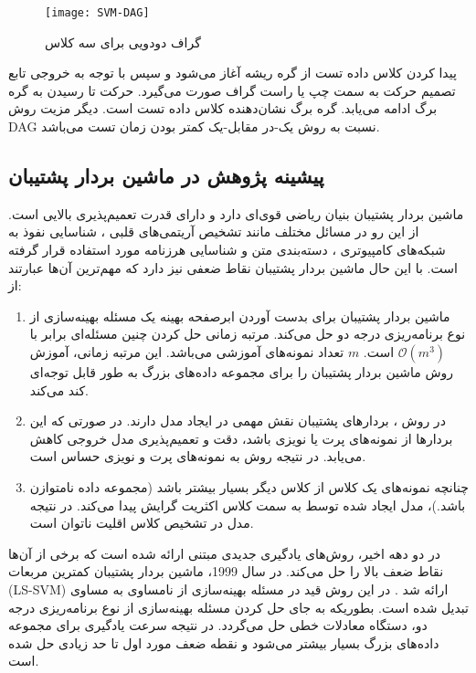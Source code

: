 \begin{figure}[!t]
	\centering
	\texttt{[image: SVM-DAG]}
	\caption[گراف دودویی  برای سه کلاس]{گراف دودویی  برای سه کلاس \cite{shigeo2005}}
	\label{fig:SVM-DAG}
\end{figure}

پیدا کردن کلاس داده تست از گره ریشه آغاز می‌شود و سپس با توجه به خروجی تابع تصمیم حرکت به سمت چپ یا راست گراف صورت می‌گیرد. حرکت  تا رسیدن به گره برگ ادامه می‌یابد. گره برگ نشان‌دهنده کلاس داده تست است. دیگر مزیت روش \gls*{DAG} نسبت به روش یک-در مقابل-یک کمتر بودن زمان تست می‌باشد.


\subsection{پیشینه پژوهش در ماشین بردار پشتیبان}\label{sec:2:1:4}
ماشین بردار پشتیبان بنیان ریاضی قوی‌ای دارد و دارای قدرت تعمیم‌پذیری بالایی است. از این رو در مسائل مختلف مانند تشخیص آریتمی‌های قلبی \cite{nasiri2009}، شناسایی نفوذ به شبکه‌های کامپیوتری \cite{raman2017}، دسته‌بندی متن \cite{lee2012} و شناسایی هرزنامه \cite{zoubi2018} مورد استفاده قرار گرفته است. با این حال ماشین بردار پشتیبان نقاط ضعفی نیز دارد که مهم‌ترین آن‌ها عبارتند از:
\begin{enumerate}
	\item ماشین بردار پشتیبان برای بدست آوردن ابرصفحه بهینه یک مسئله بهینه‌سازی از نوع برنامه‌ریزی درجه دو حل می‌کند. مرتبه زمانی حل کردن چنین مسئله‌ای برابر با   $\mathcal{O}({{m}^{3}})$ است.  $m$ تعداد نمونه‌های آموزشی می‌باشد. این مرتبه زمانی، آموزش روش ماشین بردار پشتیبان را برای مجموعه داده‌های بزرگ به طور قابل توجه‌ای کند می‌کند.
	\item در روش ، بردارهای پشتیبان نقش مهمی در ایجاد مدل دارند. در صورتی که این بردارها از نمونه‌های پرت یا نویزی باشد، دقت و تعمیم‌پذیری مدل خروجی کاهش می‌یابد. در نتیجه روش  به نمونه‌های پرت و نویزی حساس است.
	\item چنانچه نمونه‌های یک کلاس از کلاس دیگر بسیار بیشتر باشد (مجموعه داده نامتوازن باشد.)، مدل ایجاد شده توسط   به سمت کلاس اکثریت گرایش پیدا می‌کند. در نتیجه مدل در تشخیص کلاس اقلیت ناتوان است.
\end{enumerate}

\indent در دو دهه اخیر، روش‌های یادگیری جدیدی مبتنی  ارائه شده است که برخی از آن‌ها نقاط ضعف بالا را حل می‌کند. در سال 1999، ماشین بردار پشتیبان کمترین مربعات (\gls{LS-SVM}) ارائه شد \cite{suykens1999}. در این روش قید در مسئله بهینه‌سازی از نامساوی به مساوی تبدیل شده است. بطوریکه به جای حل کردن مسئله بهینه‌سازی از نوع برنامه‌ریزی درجه دو، دستگاه معادلات خطی حل می‌گردد. در نتیجه سرعت یادگیری برای مجموعه داده‌های بزرگ بسیار بیشتر می‌شود و نقطه ضعف مورد اول تا حد زیادی حل شده است.

